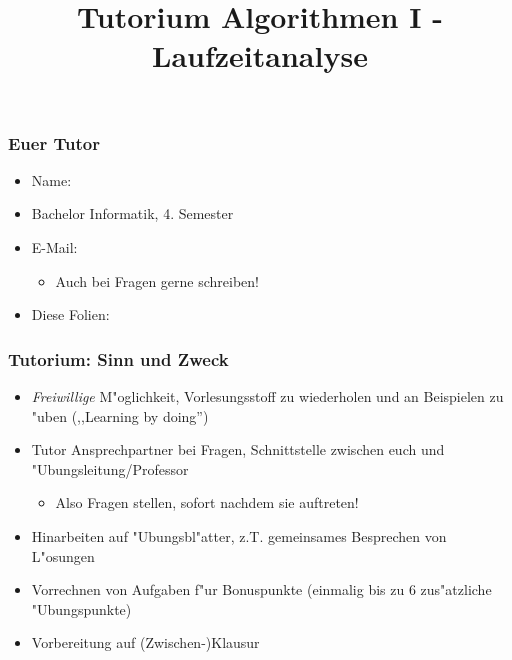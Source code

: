 \documentclass[t]{beamer}
\title[]{Tutorium Algorithmen I - Laufzeitanalyse}
\subtitle{\authorName}
\author[]{\authorName}
\institute[]{INSTITUT FÜR THEORETISCHE INFORMATIK, PROF. SANDERS}
\begin{document}
\begin{frame}
  \maketitle
\end{frame}

\begin{frame}
  \frametitle{Euer Tutor}
  \begin{itemize}
    \item Name: \authorName
    \item Bachelor Informatik, 4. Semester
    \item E-Mail: \authorEmail
      \begin{itemize}
      \item Auch bei Fragen gerne schreiben!
      \end{itemize}
    \item Diese Folien: \authorHomepage
  \end{itemize}
\end{frame}

\begin{frame}
  \frametitle{Tutorium: Sinn und Zweck}
  \begin{itemize}
    \item \emph{Freiwillige} M"oglichkeit, Vorlesungsstoff zu wiederholen und
          an Beispielen zu "uben (,,Learning by doing'')
    \item Tutor Ansprechpartner bei Fragen, Schnittstelle zwischen euch und
          "Ubungsleitung/Professor
      \begin{itemize}
      \item Also Fragen stellen, sofort nachdem sie auftreten!
      \end{itemize}
    \item Hinarbeiten auf "Ubungsbl"atter, z.T. gemeinsames Besprechen von L"osungen
    \item Vorrechnen von Aufgaben f"ur Bonuspunkte
          (einmalig bis zu 6 zus"atzliche "Ubungspunkte)
    \item Vorbereitung auf (Zwischen-)Klausur
  \end{itemize}
\end{frame}
\end{document}
